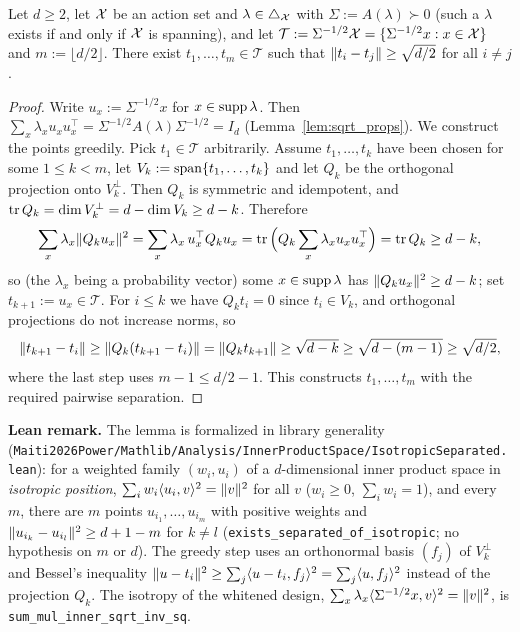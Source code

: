 \begin{lemma}\label{lem:whitened_separated_points}
\leanok
{}
Let $d \ge 2$, let $\mathcal{X}$ be an action set and $\lambda \in \triangle_{\mathcal{X}}$ with
$\Sigma := A(\lambda) \succ 0$ (such a $\lambda$ exists if and only if $\mathcal{X}$ is spanning), and let
$\mathcal T := \Sigma^{-1/2}\mathcal{X} = \{\Sigma^{-1/2}x : x \in \mathcal{X}\}$ and $m := \lfloor d/2 \rfloor$.
There exist $t_1, \dots, t_m \in \mathcal T$ such that $\lVert t_i - t_j \rVert \ge \sqrt{d/2}$
for all $i \ne j$.
\end{lemma}

\begin{proof}
\leanok
{}
Write $u_x := \Sigma^{-1/2}x$ for $x \in \operatorname{supp}\lambda$. Then
$\sum_{x}\lambda_x u_xu_x^\top = \Sigma^{-1/2}A(\lambda)\Sigma^{-1/2} = I_d$
(Lemma~\ref{lem:sqrt_props}). We construct the points greedily. Pick $t_1 \in \mathcal T$
arbitrarily. Assume $t_1,\dots,t_k$ have been chosen for some $1 \le k < m$, let
$V_k := \operatorname{span}\{t_1,\dots,t_k\}$ and let $Q_k$ be the orthogonal projection onto
$V_k^\perp$. Then $Q_k$ is symmetric and idempotent, and
$\operatorname{tr} Q_k = \dim V_k^\perp = d - \dim V_k \ge d - k$. Therefore
\[
  \sum_x \lambda_x \lVert Q_k u_x \rVert^2 = \sum_x\lambda_x\, u_x^\top Q_k u_x
  = \operatorname{tr}\Big(Q_k \sum_x\lambda_x u_xu_x^\top\Big) = \operatorname{tr} Q_k \ge d - k ,
\]
so (the $\lambda_x$ being a probability vector) some $x \in \operatorname{supp}\lambda$ has
$\lVert Q_ku_x \rVert^2 \ge d-k$; set $t_{k+1} := u_x \in \mathcal T$. For $i \le k$ we have
$Q_kt_i = 0$ since $t_i \in V_k$, and orthogonal projections do not increase norms, so
\[
  \lVert t_{k+1} - t_i \rVert \ge \lVert Q_k(t_{k+1}-t_i) \rVert = \lVert Q_kt_{k+1} \rVert \ge \sqrt{d-k}
  \ge \sqrt{d - (m-1)} \ge \sqrt{d/2},
\]
where the last step uses $m - 1 \le d/2 - 1$. This constructs $t_1,\dots,t_m$ with the
required pairwise separation.
\end{proof}

\textbf{Lean remark.} The lemma is formalized in library generality
(\texttt{Maiti2026Power/Mathlib/Analysis/InnerProductSpace/IsotropicSeparated.lean}): for a weighted
family $(w_i, u_i)$ of a $d$-dimensional inner product space in \emph{isotropic position},
$\sum_i w_i\langle u_i, v \rangle^2 = \lVert v \rVert^2$ for all $v$ ($w_i \ge 0$, $\sum_i w_i = 1$), and every
$m$, there are $m$ points $u_{i_1},\dots,u_{i_m}$ with positive weights and
$\lVert u_{i_k} - u_{i_l} \rVert^2 \ge d + 1 - m$ for $k \ne l$ (\texttt{exists\_separated\_of\_isotropic};
no hypothesis on $m$ or $d$). The greedy step uses an orthonormal basis $(f_j)$ of
$V_k^\perp$ and Bessel's inequality $\lVert u - t_i \rVert^2 \ge \sum_j\langle u - t_i, f_j \rangle^2 = \sum_j\langle u, f_j \rangle^2$
instead of the projection $Q_k$. The isotropy of the whitened design,
$\sum_x\lambda_x\langle \Sigma^{-1/2}x, v \rangle^2 = \lVert v \rVert^2$, is \texttt{sum\_mul\_inner\_sqrt\_inv\_sq}.

